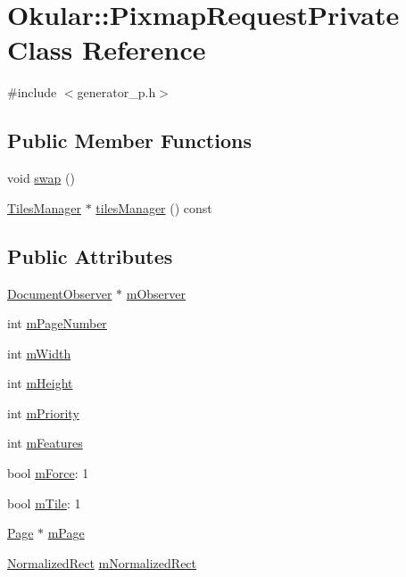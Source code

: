 \hypertarget{classOkular_1_1PixmapRequestPrivate}{\section{Okular\+:\+:Pixmap\+Request\+Private Class Reference}
\label{classOkular_1_1PixmapRequestPrivate}
}


{\ttfamily \#include $<$generator\+\_\+p.\+h$>$}

\subsection*{Public Member Functions}
\begin{DoxyCompactItemize}
\item 
void \hyperlink{classOkular_1_1PixmapRequestPrivate_af6ce453365b841797d1c4db52f62f15e}{swap} ()
\item 
\hyperlink{classOkular_1_1TilesManager}{Tiles\+Manager} $\ast$ \hyperlink{classOkular_1_1PixmapRequestPrivate_a1765ff434c6bd718628d02bbca3cb271}{tiles\+Manager} () const 
\end{DoxyCompactItemize}
\subsection*{Public Attributes}
\begin{DoxyCompactItemize}
\item 
\hyperlink{classOkular_1_1DocumentObserver}{Document\+Observer} $\ast$ \hyperlink{classOkular_1_1PixmapRequestPrivate_acfdc694944c13c00f0c7dee73f440139}{m\+Observer}
\item 
int \hyperlink{classOkular_1_1PixmapRequestPrivate_a76f0197229b4a836b4bc75031cfa9b10}{m\+Page\+Number}
\item 
int \hyperlink{classOkular_1_1PixmapRequestPrivate_a7b18925fda75ddbca63144cd1f31a096}{m\+Width}
\item 
int \hyperlink{classOkular_1_1PixmapRequestPrivate_a756c8dbe6025c29ba8e640a272daa9e7}{m\+Height}
\item 
int \hyperlink{classOkular_1_1PixmapRequestPrivate_a9d9712057a03c6148d820d57b6840d4a}{m\+Priority}
\item 
int \hyperlink{classOkular_1_1PixmapRequestPrivate_a22a10f49133b6f62fff918434ced5c76}{m\+Features}
\item 
bool \hyperlink{classOkular_1_1PixmapRequestPrivate_acf386d17b15b2fbbeac1046a87cc487f}{m\+Force}\+: 1
\item 
bool \hyperlink{classOkular_1_1PixmapRequestPrivate_a194cda451fbff515b1c939048ee5a096}{m\+Tile}\+: 1
\item 
\hyperlink{classOkular_1_1Page}{Page} $\ast$ \hyperlink{classOkular_1_1PixmapRequestPrivate_a8de6dea67745c17947f997857c77ed07}{m\+Page}
\item 
\hyperlink{classOkular_1_1NormalizedRect}{Normalized\+Rect} \hyperlink{classOkular_1_1PixmapRequestPrivate_af40ca30608338553a1be367fa0503e04}{m\+Normalized\+Rect}
\end{DoxyCompactItemize}


